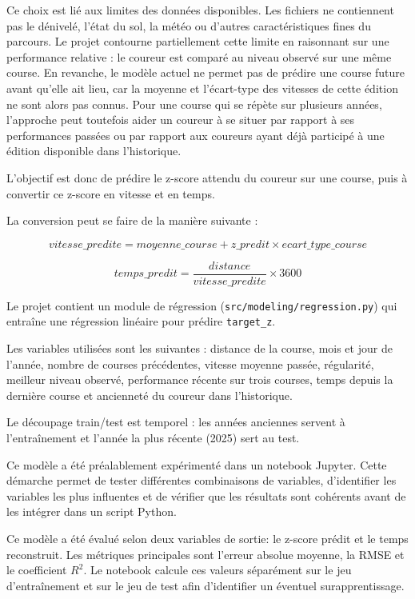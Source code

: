 \documentclass[12pt,a4paper]{article}
\begin{document}
Ce choix est lié aux limites des données disponibles. Les fichiers ne contiennent pas le dénivelé, l'état du sol, la météo ou d'autres caractéristiques fines du parcours. Le projet contourne partiellement cette limite en raisonnant sur une performance relative : le coureur est comparé au niveau observé sur une même course. En revanche, le modèle actuel ne permet pas de prédire une course future avant qu'elle ait lieu, car la moyenne et l'écart-type des vitesses de cette édition ne sont alors pas connus. Pour une course qui se répète sur plusieurs années, l'approche peut toutefois aider un coureur à se situer par rapport à ses performances passées ou par rapport aux coureurs ayant déjà participé à une édition disponible dans l'historique.

L'objectif est donc de prédire le z-score attendu du coureur sur une course, puis à convertir ce z-score en vitesse et en temps.

La conversion peut se faire de la manière suivante :

\[
vitesse\_predite = moyenne\_course + z\_predit \times ecart\_type\_course
\]

\[
temps\_predit = \frac{distance}{vitesse\_predite} \times 3600
\]

Le projet contient un module de régression (\texttt{src/modeling/regression.py}) qui entraîne une régression linéaire pour prédire \texttt{target\_z}.

Les variables utilisées sont les suivantes : distance de la course, mois et jour de l'année, nombre de courses précédentes, vitesse moyenne passée, régularité, meilleur niveau observé, performance récente sur trois courses, temps depuis la dernière course et ancienneté du coureur dans l'historique.

Le découpage train/test est temporel : les années anciennes servent à l'entraînement et l'année la plus récente (2025) sert au test.

Ce modèle a été préalablement expérimenté dans un notebook Jupyter. Cette démarche permet de tester différentes combinaisons de variables, d'identifier les variables les plus influentes et de vérifier que les résultats sont cohérents avant de les intégrer dans un script Python.

Ce modèle a été évalué selon deux variables de sortie: le z-score prédit et le temps reconstruit. Les métriques principales sont l'erreur absolue moyenne, la RMSE et le coefficient $R^2$. Le notebook calcule ces valeurs séparément sur le jeu d'entraînement et sur le jeu de test afin d'identifier un éventuel surapprentissage.
\end{document}
